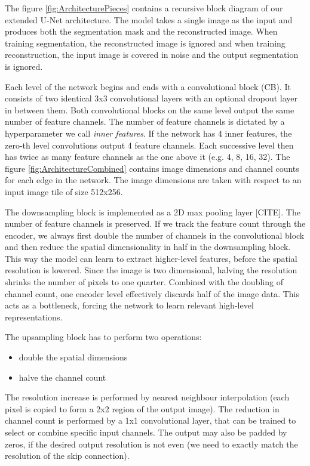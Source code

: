 The figure \ref{fig:ArchitecturePieces} contains a recursive block diagram of our extended U-Net architecture. The model takes a single image as the input and produces both the segmentation mask and the reconstructed image. When training segmentation, the reconstructed image is ignored and when training reconstruction, the input image is covered in noise and the output segmentation is ignored.

Each level of the network begins and ends with a convolutional block (CB). It consists of two identical 3x3 convolutional layers with an optional dropout layer in between them. Both convolutional blocks on the same level output the same number of feature channels. The number of feature channels is dictated by a hyperparameter we call \emph{inner features}. If the network has 4 inner features, the zero-th level convolutions output 4 feature channels. Each successive level then has twice as many feature channels as the one above it (e.g. 4, 8, 16, 32). The figure \ref{fig:ArchitectureCombined} contains image dimensions and channel counts for each edge in the network. The image dimensions are taken with respect to an input image tile of size 512x256.

The downsampling block is implemented as a 2D max pooling layer [CITE]. The number of feature channels is preserved. If we track the feature count through the encoder, we always first double the number of channels in the convolutional block and then reduce the spatial dimensionality in half in the downsampling block. This way the model can learn to extract higher-level features, before the spatial resolution is lowered. Since the image is two dimensional, halving the resolution shrinks the number of pixels to one quarter. Combined with the doubling of channel count, one encoder level effectively discards half of the image data. This acts as a bottleneck, forcing the network to learn relevant high-level representations.

The upsampling block has to perform two operations:

\begin{itemize}
    \item double the spatial dimensions
    \item halve the channel count
\end{itemize}

The resolution increase is performed by nearest neighbour interpolation (each pixel is copied to form a 2x2 region of the output image). The reduction in channel count is performed by a 1x1 convolutional layer, that can be trained to select or combine specific input channels. The output may also be padded by zeros, if the desired output resolution is not even (we need to exactly match the resolution of the skip connection).

